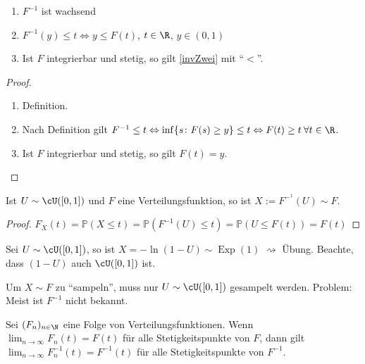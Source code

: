 \begin{lemma}\abs 
	\begin{enumerate}[label=(\roman*)]
		\item $F^{-1}$ ist wachsend
		\item \label{invZwei} $F^{-1}(y) \leq t \Leftrightarrow y \leq F(t)$, $t \in \R$, $y \in (0,1)$
		\item Ist $F$ integrierbar und stetig, so gilt \ref{invZwei} mit \enquote{$<$}.
	\end{enumerate}
\end{lemma}

\begin{proof}\abs 
	\begin{enumerate}[label=(\roman*)]
		\item Definition.
		\item Nach Definition gilt $F^{-1} \leq t \Leftrightarrow \inf \{ s \colon F(s) \geq y \} \leq t \Leftrightarrow F(t) \geq t \: \forall t \in \R$.
		\item Ist $F$ integrierbar und stetig, so gilt $F(t) = y$.
	\end{enumerate}
\end{proof}

\begin{satz}\label{NurU}
	Ist $U \sim \cU([0,1])$ und $F$ eine Verteilungsfunktion, so ist $X := F^{-^1}(U) \sim F$.
\end{satz}

\begin{proof}
	$F_X(t) = \mathbb{P}(X \leq t) = \mathbb{P}(F^{-1}(U) \leq t) = \mathbb{P}(U \leq F(t)) = F(t)$
\end{proof}

\begin{beispiel}
	Sei $U \sim \cU([0,1])$, so ist $X = - \ln(1-U) \sim \operatorname{Exp}(1)$ $\rightsquigarrow$ Übung. Beachte, dass $(1-U)$ auch $\cU([0,1])$ ist.
\end{beispiel}

\begin{anwendung}
	Um $X \sim F$ zu \enquote{sampeln}, muss nur $U \sim \cU([0,1])$ gesampelt werden. Problem: Meist ist $F^{-1}$ nicht bekannt.
\end{anwendung}

\begin{lemma}\label{Stet}
	Sei $(F_n)_{n \in \N}$ eine Folge von Verteilungsfunktionen. Wenn $\lim_{n\to\infty} F_n(t) = F(t)$ für alle Stetigkeitspunkte von $F$, dann gilt $\lim_{n\to\infty} F_n^{-1}(t) = F^{-1}(t)$ für alle Stetigkeitspunkte von $F^{-1}$.
\end{lemma}

